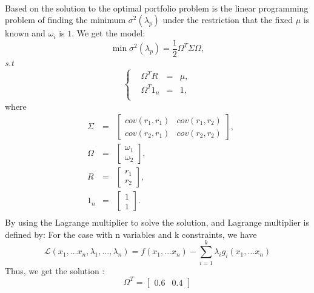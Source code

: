 \documentclass[12pt]{article}
\begin{document}
\paragraph{}
Based on the solution to the optimal portfolio problem is the linear programming problem of finding the minimum $\sigma^2(\lambda_p)$ under the restriction that the fixed $\mu$ is known and $\omega_i$ is $1$. We get the model:
\begin{equation}
    \min \sigma^2(\lambda_p)=\frac{1}{2}\Omega^{T}\Sigma \Omega,
\end{equation}
\emph{s.t}
$$
    \left\{
        \begin{aligned}
            &\Omega^{T}R&=&\mu,\\
            &\Omega^T 1_n&=&1,\\
        \end{aligned}
    \right.
$$
where
$$
        \begin{aligned}
            &\Sigma&=&\begin{bmatrix}
                cov(r_1,r_1)&cov(r_1,r_2)\\
                cov(r_2,r_1)&cov(r_2,r_2)
            \end{bmatrix},\\
            &\Omega&=&\begin{bmatrix}
                \omega_1\\
                \omega_2
            \end{bmatrix},\\
            &R&=&\begin{bmatrix}
                r_1\\
                r_2
            \end{bmatrix},\\
            &1_n&=&\begin{bmatrix}
                1\\
                1
            \end{bmatrix}.\\
        \end{aligned}
$$
By using the Lagrange multiplier to solve the solution, and Lagrange multiplier is defined by: For the case with n variables and k constraints, we have
\begin{equation}
    \mathcal{L}(x_1,...x_n,\lambda_1,...,\lambda_n)=f(x_1,...x_n)-\sum_{i=1}^k\lambda_ig_i(x_1,...x_n)
\end{equation}
Thus, we get the solution :
\begin{equation}
    \Omega^T=\begin{bmatrix}
        0.6&0.4
    \end{bmatrix}
\end{equation}
\end{document}

